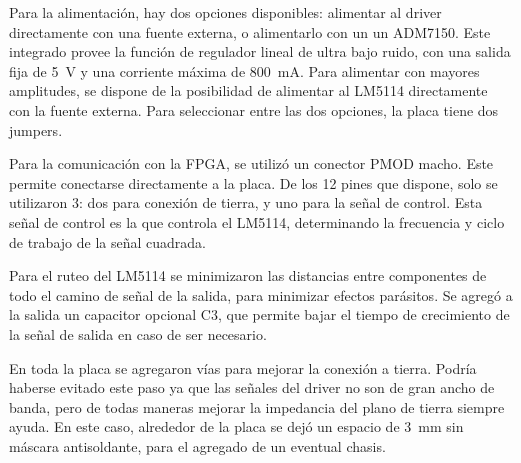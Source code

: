 Para la alimentación, hay dos opciones disponibles: alimentar al driver
directamente con una fuente externa, o alimentarlo con un un ADM7150. Este
integrado provee la función de regulador lineal de ultra bajo ruido, con una
salida fija de \qty{5}{\volt} y una corriente máxima de
\qty{800}{\milli\ampere}. Para alimentar con mayores amplitudes, se dispone de
la posibilidad de alimentar al LM5114 directamente con la fuente externa. Para
seleccionar entre las dos opciones, la placa tiene dos jumpers.

Para la comunicación con la FPGA, se utilizó un conector PMOD macho. Este
permite conectarse directamente a la placa. De los 12 pines que dispone, solo se
utilizaron 3: dos para conexión de tierra, y uno para la señal de control. Esta
señal de control es la que controla el LM5114, determinando la frecuencia y
ciclo de trabajo de la señal cuadrada.

Para el ruteo del LM5114 se minimizaron las distancias entre componentes de todo
el camino de señal de la salida, para minimizar efectos parásitos. Se agregó a
la salida un capacitor opcional C3, que permite bajar el tiempo de crecimiento
de la señal de salida en caso de ser necesario.

En toda la placa se agregaron vías para mejorar la conexión a tierra. Podría
haberse evitado este paso ya que las señales del driver no son de gran ancho de
banda, pero de todas maneras mejorar la impedancia del plano de tierra siempre
ayuda. En este caso, alrededor de la placa se dejó un espacio de
\qty{3}{\milli\meter} sin máscara antisoldante, para el agregado de un eventual
chasis.
